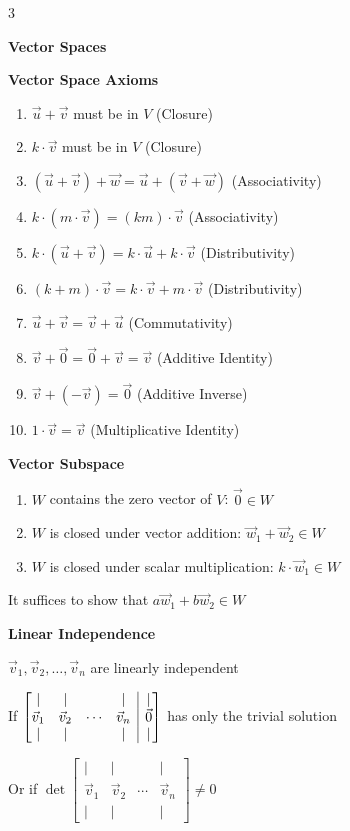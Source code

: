 \documentclass[10pt]{article}
\makeatletter
\newenvironment{amatrix}[1]{\left[\begin{array}{@{}*{#1}{c}|c@{}}}{\end{array}\right]}
\newcommand\sectionheading[1]{\begin{center}\large{\textbf{#1}}\end{center}\normalsize}
\newcommand\heading[1]{\medskip\textbf{#1}\medskip}
\makeatother
\begin{document}
\begin{multicols*}{3}
\sectionheading{Vector Spaces}

\heading{Vector Space Axioms}

\begin{enumerate}[noitemsep,topsep=0pt]
    \item $\vec u+\vec v$ must be in $V$ (Closure)
    \item $k\cdot\vec v$ must be in $V$ (Closure)
    \item $(\vec u+\vec v)+\vec w=\vec u+(\vec v+\vec w)$ (Associativity)
    \item $k\cdot(m\cdot\vec v)=(km)\cdot\vec v$ (Associativity)
    \item $k\cdot(\vec u+\vec v)=k\cdot\vec u+k\cdot\vec v$ (Distributivity)
    \item $(k+m)\cdot\vec v=k\cdot\vec v+m\cdot\vec v$ (Distributivity)
    \item $\vec u+\vec v=\vec v+\vec u$ (Commutativity)
    \item $\vec v+\vec 0=\vec 0+\vec v=\vec v$ (Additive Identity)
    \item $\vec v+(-\vec v)=\vec 0$ (Additive Inverse)
    \item $1\cdot \vec v=\vec v$ (Multiplicative Identity)
\end{enumerate}

\heading{Vector Subspace}

\begin{enumerate}[noitemsep,topsep=0pt]
    \item $W$ contains the zero vector of $V$: $\vec 0\in W$
    \item $W$ is closed under vector addition: $\vec w_1+\vec w_2\in W$
    \item $W$ is closed under scalar multiplication: $k\cdot\vec w_1\in W$
\end{enumerate}

It suffices to show that $a\vec w_1+b\vec w_2\in W$

\heading{Linear Independence}

$\vec v_1,\vec v_2,\ldots,\vec v_n$ are linearly independent

If $\begin{amatrix}{4}
    \vert & \vert & & \vert & \vert \\
    \vec v_1 & \vec v_2 & \cdots & \vec v_n & \vec 0 \\
    \vert & \vert & & \vert & \vert
\end{amatrix}$ has only the trivial solution

Or if $\det\begin{bmatrix}
    \vert & \vert & & \vert \\
    \vec v_1 & \vec v_2 & \cdots & \vec v_n \\
    \vert & \vert & & \vert
\end{bmatrix}\ne 0$


\end{multicols*}
\end{document}
